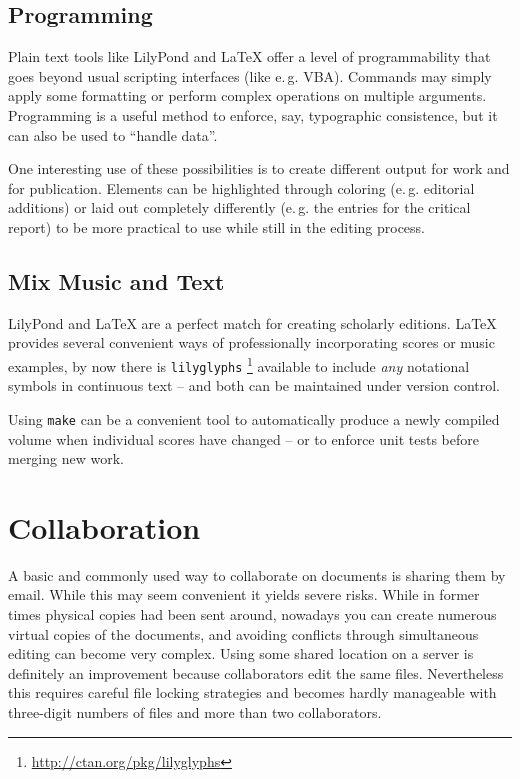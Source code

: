 \documentclass[11pt,a4paper]{article}
\begin{document}
\subsection{Programming}
Plain text tools like LilyPond and \LaTeX{} offer a level of programmability that
goes beyond usual scripting interfaces (like e.\,g. VBA). Commands may simply apply
some formatting or perform complex operations on multiple arguments.
Programming is a useful method to enforce, say, typographic consistence, but it can
also be used to “handle data”.

One interesting use of these possibilities is to create different output for work and for
publication. Elements can be highlighted through coloring (e.\,g. editorial additions)
or laid out completely differently (e.\,g. the entries for the critical report) to be
more practical to use while still in the editing process.

\subsection{Mix Music and Text}
LilyPond and \LaTeX{} are a perfect match for creating scholarly editions. \LaTeX{}
provides several convenient ways of professionally incorporating scores or music examples,
by now there is \texttt{lilyglyphs}%
\footnote{\url{http://ctan.org/pkg/lilyglyphs}}
available to include \emph{any} notational symbols in continuous text -- and both
can be maintained under version control.

Using \texttt{make} can be a convenient tool to automatically produce a newly compiled
volume when individual scores have changed -- or to enforce unit tests before merging
new work.

\section{Collaboration}\label{sec:collaboration}
A basic and commonly used way to collaborate on documents is sharing them by email.
While this may seem convenient it yields severe risks. While in former times physical
copies had been sent around, nowadays you can create numerous virtual copies of
the documents, and avoiding conflicts through simultaneous editing can
become very complex. Using some shared location on a server is definitely an improvement
because collaborators edit the same files. Nevertheless this requires careful file locking
strategies and becomes hardly manageable with three-digit numbers of files and more than
two collaborators.
\end{document}
